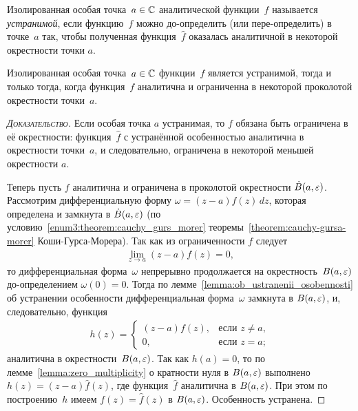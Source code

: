 \documentclass[../complex-analysis.tex]{subfiles}
\begin{document}
\begin{df}
 Изолированная особая точка~$ a \in \mathbb{C} $ аналитической функции~$ f $ называется \emph{устранимой}, если функцию~$ f $ можно до-определить (или пере-определить) в точке~$ a $ так, чтобы полученная функция~$ \hat f $ оказалась аналитичной в некоторой окрестности точки $ a $.
\end{df}
\begin{lm}
 \label{lm:Removable Singularity}
 Изолированная особая точка~$ a\in\mathbb{C} $ функции~$ f $ является устранимой, тогда и только тогда, когда функция~$ f $ аналитична и ограниченна в некоторой проколотой окрестности точки~$ a $.
\end{lm}
\begin{proof}[\normalfont\textsc{Доказательство}]
 Если особая точка $ a $ устранимая, то $ f $ обязана быть ограничена в её окрестности: функция~$ \hat f $ с устранённой особенностью аналитична в окрестности точки~$ a $, и следовательно, ограничена в некоторой меньшей окрестности $ a $.

 Теперь пусть $ f $ аналитична и ограничена в проколотой окрестности $ \dot B(a,\varepsilon) $. Рассмотрим дифференциальную форму $ \omega = (z-a) f(z)\,dz $, которая определена и замкнута в $ \dot B(a,\varepsilon) $ (по условию~\ref{enum3:theorem:cauchy_gurs_morer} теоремы~\ref{theorem:cauchy-gursa-morer} Коши-Гурса-Морера). Так как из ограниченности $ f $ следует
 \begin{align*}
  \lim_{z \to a} (z-a) f(z) = 0,
 \end{align*} то дифференциальная форма~$ \omega $ непрерывно продолжается на окрестность~$ B(a,\varepsilon) $ до-определением $ \omega(0) = 0 $. Тогда по лемме~\ref{lemma:ob_ustranenii_osobennosti} об устранении особенности дифференциальная форма~$ \omega $ замкнута в $ B(a,\varepsilon) $, и, следовательно, функция
 \begin{align*}
  h(z) = \begin{cases}
   (z-a) f(z), &\text{если } z \neq a,  \\
   0, &\text{если } z=a;
  \end{cases} 
 \end{align*} аналитична в окрестности~$ B(a,\varepsilon) $. Так как $ h(a) = 0 $, то по лемме~\ref{lemma:zero_multiplicity} о кратности нуля в $ B(a,\varepsilon) $ выполнено $ h(z) = (z-a) \hat f(z) $, где функция~$ \hat f $ аналитична в $ B(a,\varepsilon) $. При этом по построению~$ h $ имеем $ f(z) = \hat f(z) $ в $ B(a,\varepsilon) $. Особенность устранена.
\end{proof}
\end{document}
